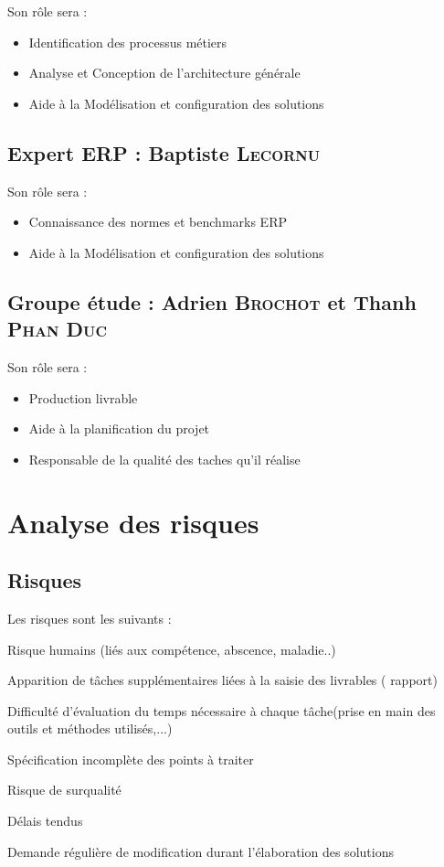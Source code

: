 Son rôle sera :
\begin{itemize}
    \item Identification des processus métiers
    \item Analyse et Conception de l’architecture générale
    \item Aide à la Modélisation et configuration des solutions 
\end{itemize}

\subsection{Expert ERP : Baptiste \textsc{Lecornu}}

Son rôle sera :
\begin{itemize}
    \item Connaissance des normes et benchmarks ERP
    \item Aide à la Modélisation et configuration des solutions 
\end{itemize}

\subsection{Groupe étude : Adrien \textsc{Brochot} et Thanh \textsc{Phan Duc}}

Son rôle sera :
\begin{itemize}
    \item Production livrable
    \item Aide à la planification du projet
    \item Responsable de la qualité des taches qu’il réalise
\end{itemize}


\section{Analyse des risques}
\subsection{Risques}

\setcounter{risques}{0}

\newcommand{\risque}[1]{
    \addtocounter{risques}{1}
    \item[R\therisques]{\indent#1}
}
Les risques sont les suivants :
\begin{description}
    \risque{Risque humains (liés aux compétence, abscence, maladie..)}
    \risque{Apparition de tâches supplémentaires liées à la saisie des livrables ( rapport)}
    \risque{Difficulté d’évaluation du temps nécessaire à chaque tâche(prise en main des outils et méthodes utilisés,...)}
    \risque{Spécification incomplète des points à traiter}
    \risque{Risque de surqualité}
    \risque{Délais tendus}
    \risque{Demande régulière de modification durant l’élaboration des solutions}
\end{description}


